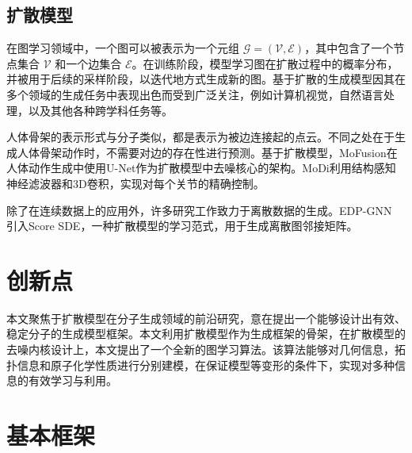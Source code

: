 \subsection{扩散模型}
在图学习领域中，一个图可以被表示为一个元组 $\mathcal{G} = (\mathcal{V}, \mathcal{E})$，其中包含了一个节点集合 $\mathcal{V}$ 和一个边集合 $\mathcal{E}$。在训练阶段，模型学习图在扩散过程中的概率分布，并被用于后续的采样阶段，以迭代地方式生成新的图。基于扩散的生成模型因其在多个领域的生成任务中表现出色而受到广泛关注，例如计算机视觉\cite{blendeddiffusion_avrahami_22,cascadeddiff_ho_22,gradforshapegen_cai_20,sgmpointcloud_luo_21}，自然语言处理\cite{struccddpm_austin_21,argmaxflow_hoogeboom_21,stepunrolled_savinov_22}，以及其他各种跨学科任务等\cite{cdvae_xie_22,housediffusion_shabani_23,nap_lei_23}。

人体骨架的表示形式与分子类似，都是表示为被边连接起的点云。不同之处在于生成人体骨架动作时，不需要对边的存在性进行预测。基于扩散模型，MoFusion\cite{mofusion_dabral_22}在人体动作生成中使用U-Net\cite{unet_ronneberger_15}作为扩散模型中去噪核心的架构。MoDi\cite{modi_raab_22}利用结构感知神经滤波器和3D卷积，实现对每个关节的精确控制。

除了在连续数据上的应用外，许多研究工作致力于离散数据的生成。EDP-GNN \cite{edpgnn_niu_20}引入Score SDE，一种扩散模型的学习范式，用于生成离散图邻接矩阵。


\section{创新点}
本文聚焦于扩散模型在分子生成领域的前沿研究，意在提出一个能够设计出有效、稳定分子的生成模型框架。本文利用扩散模型作为生成框架的骨架，在扩散模型的去噪内核设计上，本文提出了一个全新的图学习算法。该算法能够对几何信息，拓扑信息和原子化学性质进行分别建模，在保证模型等变形的条件下，实现对多种信息的有效学习与利用。

\section{基本框架}